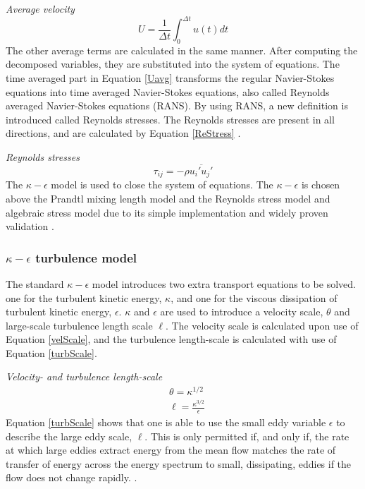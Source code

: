 \documentclass{CFD2017}
\begin{document}
\emph{Average velocity}
\begin{equation}
\label{Uavg}
U = \frac{1}{\Delta t}\int_{0}^{\Delta t}u(t)dt
\end{equation}
The other average terms are calculated in the same manner. After computing the decomposed variables, they are substituted into the system of equations. The time averaged part in Equation \ref{Uavg} transforms the regular Navier-Stokes equations into time averaged Navier-Stokes equations, also called Reynolds averaged Navier-Stokes equations (RANS). By using RANS, a new definition is introduced called Reynolds stresses. The Reynolds stresses are present in all directions, and are calculated by Equation \ref{ReStress} \cite{slides}. \vspace{2mm}

\emph{Reynolds stresses}
\begin{equation}
\label{ReStress}
\tau_{ij}=-\rho\overline{u_i'u_j'}
\end{equation}
The $\kappa-\epsilon$ model is used to close the system of equations. The $\kappa-\epsilon$ is chosen above the Prandtl mixing length model and the Reynolds stress model and algebraic stress model due to its simple implementation and widely proven validation \cite{Versteeg2007}.


\subsubsection{$\kappa-\epsilon$ turbulence model}
The standard  $\kappa-\epsilon$ model introduces two extra transport equations to be solved. one for the turbulent kinetic energy, $\kappa$, and one for the viscous dissipation of turbulent kinetic energy, $\epsilon$.  $\kappa$ and $\epsilon$ are used to introduce a velocity scale, $\theta$ and large-scale turbulence length scale $\ell$. The velocity scale is calculated upon use of Equation \ref{velScale}, and the turbulence length-scale is calculated with use of Equation \ref{turbScale}.\vspace{2mm}

\emph{Velocity- and turbulence length-scale}
\begin{align}
&\theta = \kappa^{1/2} \label{velScale}\\
&\ell=\frac{\kappa^{3/2}}{\epsilon} \label{turbScale}
\end{align}
Equation \ref{turbScale} shows that one is able to use the small eddy variable $\epsilon$ to describe the large eddy scale, $\ell$. This is only permitted if, and only if, the rate at which large eddies extract energy from the mean flow matches the rate of transfer of energy across the energy spectrum to small, dissipating, eddies if the flow does not change rapidly. \cite{Versteeg2007}.\\
\end{document}
